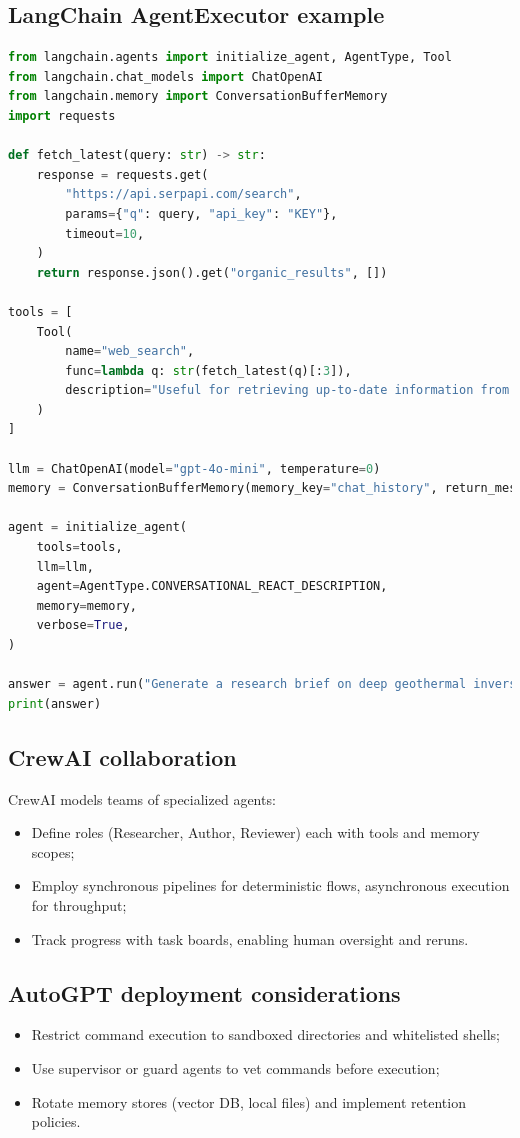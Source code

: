 \documentclass{article}
\begin{document}
\subsection{LangChain AgentExecutor example}
\begin{lstlisting}[language=Python,caption={Planner-executor agent implemented with LangChain}]
from langchain.agents import initialize_agent, AgentType, Tool
from langchain.chat_models import ChatOpenAI
from langchain.memory import ConversationBufferMemory
import requests

def fetch_latest(query: str) -> str:
    response = requests.get(
        "https://api.serpapi.com/search",
        params={"q": query, "api_key": "KEY"},
        timeout=10,
    )
    return response.json().get("organic_results", [])

tools = [
    Tool(
        name="web_search",
        func=lambda q: str(fetch_latest(q)[:3]),
        description="Useful for retrieving up-to-date information from the open web."
    )
]

llm = ChatOpenAI(model="gpt-4o-mini", temperature=0)
memory = ConversationBufferMemory(memory_key="chat_history", return_messages=True)

agent = initialize_agent(
    tools=tools,
    llm=llm,
    agent=AgentType.CONVERSATIONAL_REACT_DESCRIPTION,
    memory=memory,
    verbose=True,
)

answer = agent.run("Generate a research brief on deep geothermal inversion techniques.")
print(answer)
\end{lstlisting}

\subsection{CrewAI collaboration}
CrewAI models teams of specialized agents:
\begin{itemize}
  \item Define roles (Researcher, Author, Reviewer) each with tools and memory scopes;
  \item Employ synchronous pipelines for deterministic flows, asynchronous execution for throughput;
  \item Track progress with task boards, enabling human oversight and reruns.
\end{itemize}

\subsection{AutoGPT deployment considerations}
\begin{itemize}
  \item Restrict command execution to sandboxed directories and whitelisted shells;
  \item Use supervisor or guard agents to vet commands before execution;
  \item Rotate memory stores (vector DB, local files) and implement retention policies.
\end{itemize}
\end{document}
